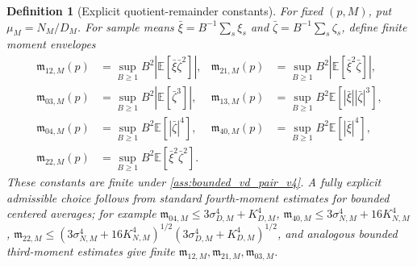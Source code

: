 \documentclass[11pt]{article}
\newtheorem{definition}{Definition}
\newcommand{\E}{\mathbb{E}}
\newcommand{\1}{\mathbf{1}}
\newcommand{\abs}[1]{\left\lvert #1 \right\rvert}
\begin{document}
\begin{definition}[Explicit quotient-remainder constants]
\label{def:quotient_constants_v4}
For fixed \((p,M)\), put \(\mu_M=N_M/D_M\).  For sample means
\(\bar\xi=B^{-1}\sum_s \xi_s\) and \(\bar\zeta=B^{-1}\sum_s\zeta_s\), define finite moment envelopes
\begin{align}
    \mathfrak m_{12,M}(p)&=\sup_{B\ge1} B^2\abs{\E[\bar\xi\bar\zeta^2]},
    &
    \mathfrak m_{21,M}(p)&=\sup_{B\ge1} B^2\abs{\E[\bar\xi^2\bar\zeta]},\\
    \mathfrak m_{03,M}(p)&=\sup_{B\ge1} B^2\abs{\E[\bar\zeta^3]},
    &
    \mathfrak m_{13,M}(p)&=\sup_{B\ge1} B^2\E[\abs{\bar\xi}\abs{\bar\zeta}^3],\\
    \mathfrak m_{04,M}(p)&=\sup_{B\ge1} B^2\E[\abs{\bar\zeta}^4],
    &
    \mathfrak m_{40,M}(p)&=\sup_{B\ge1} B^2\E[\abs{\bar\xi}^4],\\
    \mathfrak m_{22,M}(p)&=\sup_{B\ge1} B^2\E[\bar\xi^2\bar\zeta^2].
\end{align}
These constants are finite under \cref{ass:bounded_vd_pair_v4}.  A fully explicit admissible choice follows from standard fourth-moment estimates for bounded centered averages; for example
\(\mathfrak m_{04,M}\le 3\sigma_{D,M}^4+K_{D,M}^4\),
\(\mathfrak m_{40,M}\le 3\sigma_{N,M}^4+16K_{N,M}^4\),
\(\mathfrak m_{22,M}\le (3\sigma_{N,M}^4+16K_{N,M}^4)^{1/2}(3\sigma_{D,M}^4+K_{D,M}^4)^{1/2}\), and analogous bounded third-moment estimates give finite \(\mathfrak m_{12,M},\mathfrak m_{21,M},\mathfrak m_{03,M}\).


\end{definition}
\end{document}
